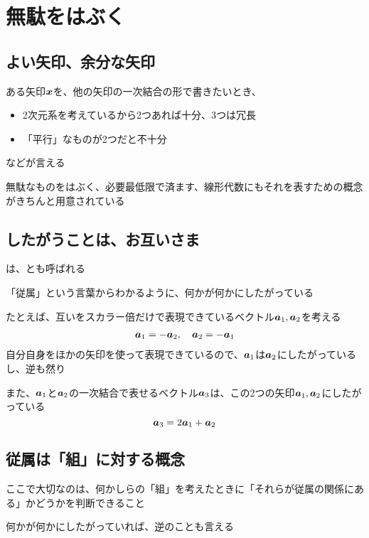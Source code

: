 \documentclass[../book_half_step_linear]{subfiles}
\begin{document}
\section{無駄をはぶく}

\subsection{よい矢印、余分な矢印}

ある矢印$\vb*{x}$を、他の矢印の一次結合の形で書きたいとき、
\begin{itemize}
  \item 2次元系を考えているから2つあれば十分、3つは冗長
  \item 「平行」なものが2つだと不十分
\end{itemize}
などが言える

無駄なものをはぶく、必要最低限で済ます、線形代数にもそれを表すための概念がきちんと用意されている

\sectionline
\subsection{したがうことは、お互いさま}

は、とも呼ばれる

「従属」という言葉からわかるように、何かが何かにしたがっている

たとえば、互いをスカラー倍だけで表現できているベクトル$\vb*{a}_1, \vb*{a}_2$を考える
\begin{align*}
  \vb*{a}_1 = -\vb*{a}_2 , \quad \vb*{a}_2 = -\vb*{a}_1
\end{align*}
自分自身をほかの矢印を使って表現できているので、$\vb*{a}_1$は$\vb*{a}_2$にしたがっているし、逆も然り

また、$\vb*{a}_1$と$\vb*{a}_2$の一次結合で表せるベクトル$\vb*{a}_3$は、この2つの矢印$\vb*{a}_1, \vb*{a}_2$にしたがっている
\begin{equation*}
  \vb*{a}_3 = 2\vb*{a}_1 + \vb*{a}_2
\end{equation*}

\sectionline
\subsection{従属は「組」に対する概念}

ここで大切なのは、何かしらの「組」を考えたときに「それらが従属の関係にある」かどうかを判断できること

何かが何かにしたがっていれば、逆のことも言える
\end{document}
